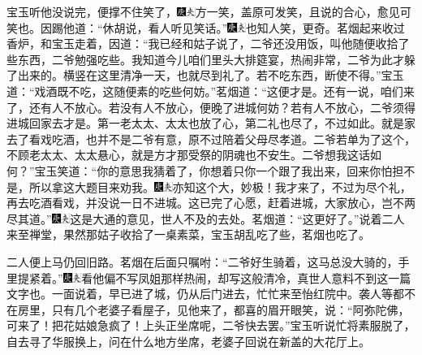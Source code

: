 宝玉听他没说完，便撑不住笑了，{\includegraphics[width=3mm]{../Images/00004}\includegraphics[width=3mm]{../Images/00012}\footnotesize \kaishu 方一笑，盖原可发笑，且说的合心，愈见可笑也。}因踢他道：“休胡说，看人听见笑话。”{\includegraphics[width=3mm]{../Images/00004}\includegraphics[width=3mm]{../Images/00012}\footnotesize \kaishu 也知人笑，更奇。}茗烟起来收过香炉，和宝玉走着，因道：“我已经和姑子说了，二爷还没用饭，叫他随便收拾了些东西，二爷勉强吃些。我知道今儿咱们里头大排筵宴，热闹非常，二爷为此才躲了出来的。横竖在这里清净一天，也就尽到礼了。若不吃东西，断使不得。”宝玉道：“戏酒既不吃，这随便素的吃些何妨。”茗烟道：“这便才是。还有一说，咱们来了，还有人不放心。若没有人不放心，便晚了进城何妨？若有人不放心，二爷须得进城回家去才是。第一老太太、太太也放了心，第二礼也尽了，不过如此。就是家去了看戏吃酒，也并不是二爷有意，原不过陪着父母尽孝道。二爷若单为了这个，不顾老太太、太太悬心，就是方才那受祭的阴魂也不安生。二爷想我这话如何？”宝玉笑道：“你的意思我猜着了，你想着只你一个跟了我出来，回来你怕担不是，所以拿这大题目来劝我。{\includegraphics[width=3mm]{../Images/00004}\includegraphics[width=3mm]{../Images/00012}\footnotesize \kaishu 亦知这个大，妙极！}我才来了，不过为尽个礼，再去吃酒看戏，并没说一日不进城。这已完了心愿，赶着进城，大家放心，岂不两尽其道。”{\includegraphics[width=3mm]{../Images/00004}\includegraphics[width=3mm]{../Images/00012}\footnotesize \kaishu 这是大通的意见，世人不及的去处。}茗烟道：“这更好了。”说着二人来至禅堂，果然那姑子收拾了一桌素菜，宝玉胡乱吃了些，茗烟也吃了。

二人便上马仍回旧路。茗烟在后面只嘱咐：“二爷好生骑着，这马总没大骑的，手里提紧着。”{\includegraphics[width=3mm]{../Images/00004}\includegraphics[width=3mm]{../Images/00012}\footnotesize \kaishu 看他偏不写凤姐那样热闹，却写这般清冷，真世人意料不到这一篇文字也。}一面说着，早已进了城，仍从后门进去，忙忙来至怡红院中。袭人等都不在房里，只有几个老婆子看屋子，见他来了，都喜的眉开眼笑，说：“阿弥陀佛，可来了！把花姑娘急疯了！上头正坐席呢，二爷快去罢。”宝玉听说忙将素服脱了，自去寻了华服换上，问在什么地方坐席，老婆子回说在新盖的大花厅上。

